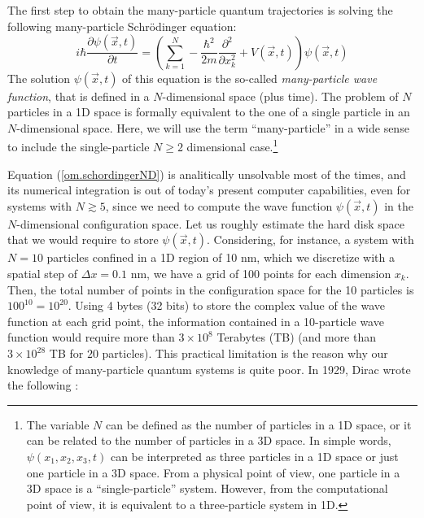 \documentclass[onecolumn,nofootinbib, secnumarabic, amsmath, nobibnotes,12pt,aps,pra]{revtex4-1}
\newcommand{\Eref}[1]{Equation (\ref{#1})}
\begin{document}
The first step to obtain the many-particle quantum trajectories is solving the following many-particle Schr\"{o}dinger equation:
\begin{equation}
\label{om.schordingerND}
i \hbar \frac{\partial \psi(\vec{x},t)}{\partial t} = \left(\sum_{k = 1}^N -\frac{\hbar^2}{2m}\frac {\partial^2} {\partial x_k^2} + V(\vec{x},t) \right) \psi(\vec{x},t)
\end{equation}
The solution $\psi(\vec{x},t)$ of this equation is the so-called
\textit{many-particle wave function}, that is defined in a
$N$-dimensional space (plus time). The problem of $N$ particles in a
1D space is formally equivalent to the one of a single particle in
an $N$-dimensional space. Here, we will use the term ``many-particle''
in a wide sense to include the single-particle $N\geq2$
dimensional case.\footnote{The variable $N$ can be defined as the
number of particles in a 1D space, or it can be related to the
number of particles in a 3D space. In
simple words, $\psi(x_1,x_2,x_3,t)$ can be interpreted as three
particles in a 1D space or just one particle in a 3D space. From a
physical point of view, one particle in a 3D space is a
``single-particle'' system. However, from the computational point of
view, it is equivalent to a three-particle system in 1D.}

\Eref{om.schordingerND} is analitically unsolvable most of the times, and its numerical integration is out of today's present computer capabilities, even for systems with $N \gtrsim 5$, since we need to compute the wave function $\psi(\vec{x},t)$ in the $N$-dimensional configuration space.
Let us roughly estimate the hard disk space that we would require to store $\psi(\vec{x},t)$.
Considering, for instance, a system with $N = 10$ particles confined in a 1D region of 10 nm, which we discretize with a spatial step of $\Delta x = 0.1$ nm, we have a grid of 100 points for each dimension $x_k$.
Then, the total number of points in the configuration space for the 10 particles is $100^{10} = 10^{20}$.
Using 4 bytes (32 bits) to store the complex value of the wave function at each grid point, the information contained in a 10-particle wave function would require more than $3 \times 10^8$ Terabytes (TB) (and more than $3\times 10^{28}$ TB for $20$ particles).
This practical limitation is the reason why our knowledge of many-particle quantum systems is quite poor.
In 1929, Dirac wrote the following \cite{om.dirac1929bis}:\\\vspace*{-6pt}
\end{document}
